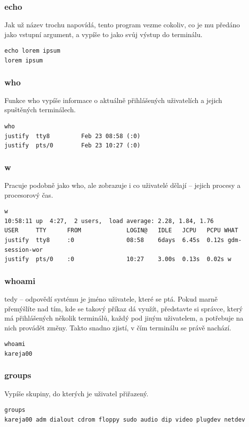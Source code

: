 \documentclass{article}
\begin{document}
\subsubsection{echo}
Jak už název trochu napovídá, tento program vezme cokoliv, co je mu předáno jako vstupní argument, a vypíše to jako svůj výstup do terminálu.
\begin{verbatim}
echo lorem ipsum
lorem ipsum
\end{verbatim}

\subsubsection{who}
Funkce who vypíše informace o aktuálně přihlášených uživatelích a jejich spuštěných terminálech.
\begin{verbatim}
who
justify  tty8         Feb 23 08:58 (:0)
justify  pts/0        Feb 23 10:27 (:0)
\end{verbatim}

\subsubsection{w}
Pracuje podobně jako who, ale zobrazuje i co uživatelé dělají -- jejich procesy a procesorový čas.
\begin{verbatim}
w
10:58:11 up  4:27,  2 users,  load average: 2.28, 1.84, 1.76
USER     TTY      FROM             LOGIN@   IDLE   JCPU   PCPU WHAT
justify  tty8     :0               08:58    6days  6.45s  0.12s gdm-session-wor
justify  pts/0    :0               10:27    3.00s  0.13s  0.02s w
\end{verbatim}

\subsubsection{whoami}
 tedy  -- odpovědí systému je jméno uživatele, které se ptá. Pokud marně přemýšlíte nad tím, kde se takový příkaz dá využít, představte si správce, který má přihlášených několik terminálů, každý pod jiným uživatelem, a potřebuje na nich provádět změny. Takto snadno zjistí, v čím terminálu se právě nachází.
\begin{verbatim}
whoami
kareja00
\end{verbatim}

\subsubsection{groups}
Vypíše skupiny, do kterých je uživatel přiřazený.
\begin{verbatim}
groups
kareja00 adm dialout cdrom floppy sudo audio dip video plugdev netdev	
\end{verbatim}
\end{document}
